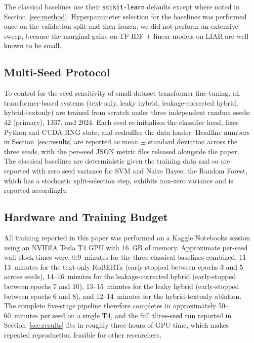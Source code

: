 \documentclass[journal]{IEEEtran}
\begin{document}
The classical baselines use their \texttt{scikit-learn} defaults except where noted in Section~\ref{sec:method}. Hyperparameter selection for the baselines was performed once on the validation split and then frozen; we did not perform an extensive sweep, because the marginal gains on TF-IDF + linear models on LIAR are well known to be small.

\subsection{Multi-Seed Protocol}
\label{subsec:multiseed}
To control for the seed sensitivity of small-dataset transformer fine-tuning, all transformer-based systems (text-only, leaky hybrid, leakage-corrected hybrid, hybrid-textonly) are trained from scratch under three independent random seeds: 42 (primary), 1337, and 2024. Each seed re-initialises the classifier head, fixes Python and CUDA RNG state, and reshuffles the data loader. Headline numbers in Section~\ref{sec:results} are reported as mean $\pm$ standard deviation across the three seeds, with the per-seed JSON metric files released alongside the paper. The classical baselines are deterministic given the training data and so are reported with zero seed variance for SVM and Naive Bayes; the Random Forest, which has a stochastic split-selection step, exhibits non-zero variance and is reported accordingly.

\subsection{Hardware and Training Budget}
All training reported in this paper was performed on a Kaggle Notebooks session using an NVIDIA Tesla T4 GPU with 16~GB of memory. Approximate per-seed wall-clock times were: 0.9~minutes for the three classical baselines combined, 11--13~minutes for the text-only RoBERTa (early-stopped between epochs 3 and 5 across seeds), 14--16~minutes for the leakage-corrected hybrid (early-stopped between epochs 7 and 10), 13--15~minutes for the leaky hybrid (early-stopped between epochs 6 and 8), and 12--14~minutes for the hybrid-textonly ablation. The complete five-stage pipeline therefore completes in approximately 50--60~minutes per seed on a single T4, and the full three-seed run reported in Section~\ref{sec:results} fits in roughly three hours of GPU time, which makes repeated reproduction feasible for other researchers.
\end{document}
